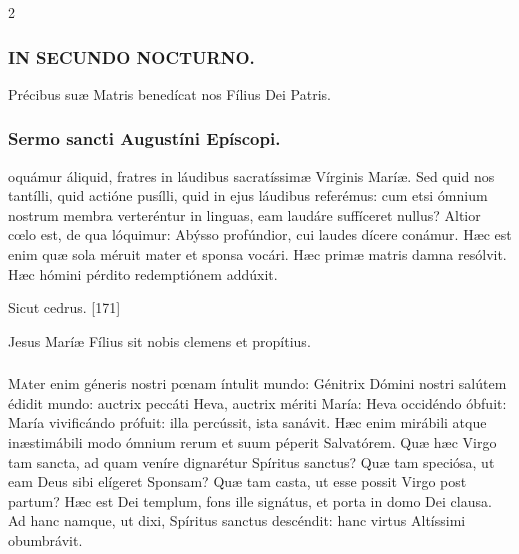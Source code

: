 \documentclass[9pt,twoside]{extarticle}
\begin{document}
\begin{multicols}{2}
\subsubsection*{\center \textsc{IN SECUNDO NOCTURNO.}}
\begin{tightlist}{}
\item {\small {} Précibus suæ Matris benedícat nos Fílius Dei Patris.}
\end{tightlist}
\subsubsection*{\center Sermo sancti Augustíni Epíscopi.}
\begin{center}\end{center}
oquámur áliquid, fratres in láudibus sacratíssimæ Vírginis Maríæ. Sed quid nos tantílli, quid actióne pusílli, quid in ejus láudibus referémus: cum etsi ómnium nostrum membra verteréntur in linguas, eam laudáre suffíceret nullus? Altior cœlo est, de qua lóquimur: Abýsso profúndior, cui laudes dícere conámur. Hæc est enim quæ sola méruit mater et sponsa vocári. Hæc primæ matris damna resólvit. Hæc hómini pérdito redemptiónem addúxit.

\begin{tightlist}{}
\item {} Sicut cedrus. [171]
\item {\small {} Jesus Maríæ Fílius sit nobis clemens et propítius.}
\end{tightlist}

\subsubsection*{\center {}}
\lettrine{M}ater enim géneris nostri pœnam íntulit mundo: Génitrix Dómini nostri salútem édidit mundo: auctrix peccáti Heva, auctrix mériti María: Heva occidéndo óbfuit: María vivificándo prófuit: illa percússit, ista sanávit. Hæc enim mirábili atque inæstimábili modo ómnium rerum et suum péperit Salvatórem. Quæ hæc Virgo tam sancta, ad quam veníre dignarétur Spíritus sanctus? Quæ tam speciósa, ut eam Deus sibi elígeret Sponsam? Quæ tam casta, ut esse possit Virgo post partum? Hæc est Dei templum, fons ille signátus, et porta in domo Dei clausa. Ad hanc namque, ut dixi, Spíritus sanctus descéndit: hanc virtus Altíssimi obumbrávit.


\end{multicols}
\end{document}
